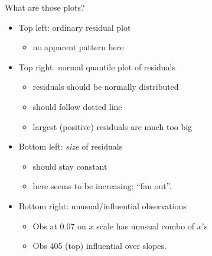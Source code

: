 \begin{frame}[fragile]{What are those plots?}
  
  \begin{itemize}
  \item Top left: ordinary residual plot
    \begin{itemize}
    \item no apparent pattern here
    \end{itemize}
  \item Top right: normal quantile plot of residuals
    \begin{itemize}
    \item residuals should be normally distributed
    \item should follow dotted line
    \item largest (positive) residuals are much too big
    \end{itemize}
  \item Bottom left: \emph{size} of residuals
    \begin{itemize}
    \item should stay constant
    \item here seems to be increasing: ``fan out''.
    \end{itemize}
  \item Bottom right: unusual/influential observations
    \begin{itemize}
    \item Obs at 0.07 on $x$ scale has unusual combo of $x$'s
    \item Obs 405 (top) influential over slopes.
    \end{itemize}
  \end{itemize}
  
\end{frame}



